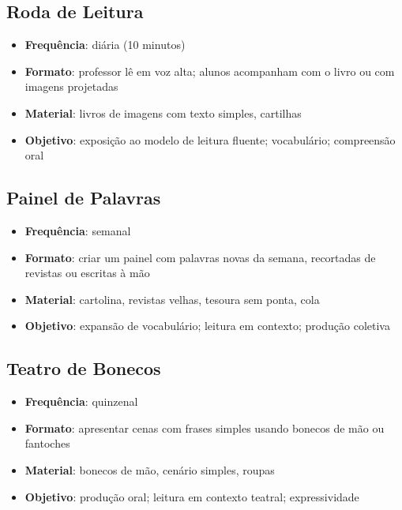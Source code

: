 \subsection{Roda de Leitura}
\begin{itemize}[leftmargin=2cm]
  \item \textbf{Frequ\^{e}ncia}: di\'{a}ria (10 minutos)
  \item \textbf{Formato}: professor l\^{e} em voz alta; alunos acompanham
  com o livro ou com imagens projetadas
  \item \textbf{Material}: livros de imagens com texto simples, cartilhas
  \item \textbf{Objetivo}: exposi\c{c}\~{a}o ao modelo de leitura fluente;
  vocabul\'{a}rio; compreens\~{a}o oral
\end{itemize}

\subsection{Painel de Palavras}
\begin{itemize}[leftmargin=2cm]
  \item \textbf{Frequ\^{e}ncia}: semanal
  \item \textbf{Formato}: criar um painel com palavras novas da semana,
  recortadas de revistas ou escritas à m\~{a}o
  \item \textbf{Material}: cartolina, revistas velhas, tesoura sem ponta, cola
  \item \textbf{Objetivo}: expans\~{a}o de vocabul\'{a}rio; leitura em contexto;
  produ\c{c}\~{a}o coletiva
\end{itemize}

\subsection{Teatro de Bonecos}
\begin{itemize}[leftmargin=2cm]
  \item \textbf{Frequ\^{e}ncia}: quinzenal
  \item \textbf{Formato}: apresentar cenas com frases simples usando
  bonecos de m\~{a}o ou fantoches
  \item \textbf{Material}: bonecos de m\~{a}o, cen\'{a}rio simples, roupas
  \item \textbf{Objetivo}: produ\c{c}\~{a}o oral; leitura em contexto
  teatral; expressividade
\end{itemize}

